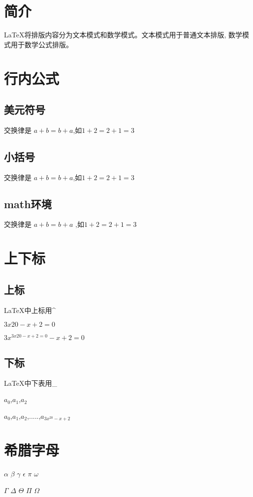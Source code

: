 \documentclass{article}
\begin{document}
	\section{简介}
	\LaTeX{}将排版内容分为文本模式和数学模式。文本模式用于普通文本排版, 数学模式用于数学公式排版。
	\section{行内公式}
	\subsection{美元符号}
	交换律是 $a+b=b+a$,如$1+2=2+1=3$
	\subsection{小括号}
	交换律是 \(a+b=b+a\),如\(1+2=2+1=3\)
	\subsection{math环境}
	交换律是 \begin{math}a+b=b+a\end{math}
	,如\begin{math}1+2=2+1=3\end{math}
	\section{上下标}
	\subsection{上标}
	\LaTeX{}中上标用\^{} 
	
	$3x{20}-x+2=0$
	
	$3x^{3x{20}-x+2=0}-x+2=0$
	\subsection{下标}
	
	\LaTeX{}中下表用\_{}
	
	$a_0$,$a_1$,$a_2$
	
	$a_0$,$a_1$,$a_2$,.....,$a_{3x^{20}-x+2}$
	
	\section{希腊字母}
	$\alpha$
	$\beta$
	$\gamma$
	$\epsilon$
	$\pi$
	$\omega$
	
	$\Gamma$
	$\Delta$
	$\Theta$
	$\Pi$  %
	$\Omega$
	
\end{document}

